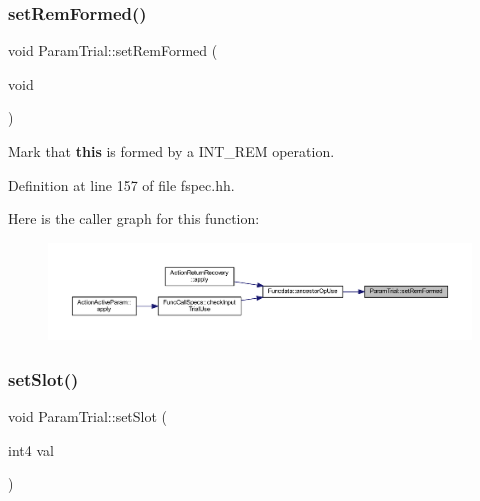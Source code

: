 \mbox{\label{class_param_trial_a3fa95bb637e208d366f70cecaa6c331d}} 
\subsubsection{\texorpdfstring{setRemFormed()}{setRemFormed()}}
{\footnotesize\ttfamily void Param\+Trial\+::set\+Rem\+Formed (\begin{DoxyParamCaption}\item[{void}]{ }\end{DoxyParamCaption})\hspace{0.3cm}{\ttfamily [inline]}}



Mark that {\bfseries{this}} is formed by a I\+N\+T\+\_\+\+R\+EM operation. 



Definition at line 157 of file fspec.\+hh.

Here is the caller graph for this function\+:
\nopagebreak
\begin{figure}[H]
\begin{center}
\leavevmode
\includegraphics[width=350pt]{class_param_trial_a3fa95bb637e208d366f70cecaa6c331d_icgraph}
\end{center}
\end{figure}
\mbox{\label{class_param_trial_a64a57d4768366a15b920f0670ad2e83d}} 
\subsubsection{\texorpdfstring{setSlot()}{setSlot()}}
{\footnotesize\ttfamily void Param\+Trial\+::set\+Slot (\begin{DoxyParamCaption}\item[{int4}]{val }\end{DoxyParamCaption})\hspace{0.3cm}{\ttfamily [inline]}}



